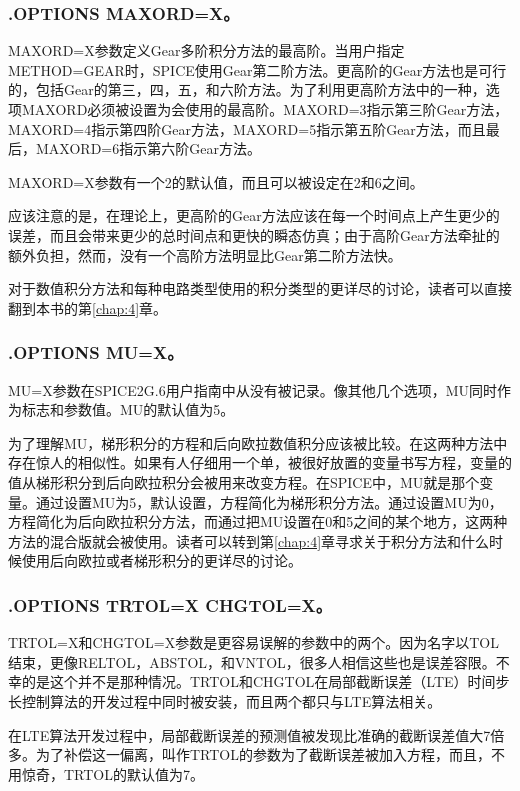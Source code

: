 \subsubsection{.OPTIONS MAXORD=X。}
MAXORD=X参数定义Gear多阶积分方法的最高阶。当用户指定METHOD=GEAR时，SPICE使用Gear第二阶方法。更高阶的Gear方法也是可行的，包括Gear的第三，四，五，和六阶方法。为了利用更高阶方法中的一种，选项MAXORD必须被设置为会使用的最高阶。MAXORD=3指示第三阶Gear方法，MAXORD=4指示第四阶Gear方法，MAXORD=5指示第五阶Gear方法，而且最后，MAXORD=6指示第六阶Gear方法。

MAXORD=X参数有一个2的默认值，而且可以被设定在2和6之间。

应该注意的是，在理论上，更高阶的Gear方法应该在每一个时间点上产生更少的误差，而且会带来更少的总时间点和更快的瞬态仿真；由于高阶Gear方法牵扯的额外负担，然而，没有一个高阶方法明显比Gear第二阶方法快\cite{chap6-2}。

对于数值积分方法和每种电路类型使用的积分类型的更详尽的讨论，读者可以直接翻到本书的第\ref{chap:4}章。

\subsubsection{.OPTIONS MU=X。}
MU=X参数在SPICE2G.6用户指南\cite{chap6-1}中从没有被记录。像其他几个选项，MU同时作为标志和参数值。MU的默认值为5。

为了理解MU，梯形积分的方程和后向欧拉数值积分应该被比较。在这两种方法中存在惊人的相似性。如果有人仔细用一个单，被很好放置的变量书写方程，变量的值从梯形积分到后向欧拉积分会被用来改变方程。在SPICE中，MU就是那个变量。通过设置MU为5，默认设置，方程简化为梯形积分方法。通过设置MU为0，方程简化为后向欧拉积分方法，而通过把MU设置在0和5之间的某个地方，这两种方法的混合版就会被使用。读者可以转到第\ref{chap:4}章寻求关于积分方法和什么时候使用后向欧拉或者梯形积分的更详尽的讨论。

\subsubsection{.OPTIONS TRTOL=X CHGTOL=X。}
TRTOL=X和CHGTOL=X参数是更容易误解的参数中的两个。因为名字以TOL结束，更像RELTOL，ABSTOL，和VNTOL，很多人相信这些也是误差容限。不幸的是这个并不是那种情况。TRTOL和CHGTOL在局部截断误差（LTE）时间步长控制算法的开发过程中同时被安装，而且两个都只与LTE算法相关。

在LTE算法开发过程中，局部截断误差的预测值被发现比准确的截断误差值大7倍多\cite{chap6-2}。为了补偿这一偏离，叫作TRTOL的参数为了截断误差被加入方程，而且，不用惊奇，TRTOL的默认值为7。

